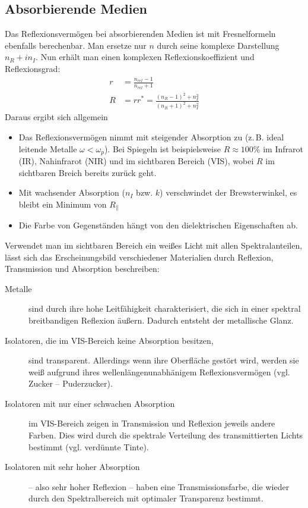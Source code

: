 
\subsection{Absorbierende Medien}
Das Reflexionsvermögen bei absorbierenden Medien ist mit
Fresnelformeln ebenfalls berechenbar. 
Man ersetze nur $n$ durch seine komplexe Darstellung $n_R+in_I$. Nun
erhält man einen komplexen Reflexionskoeffizient und
Reflexionsgrad:
\begin{align*}
  r &= \frac{n_{rel}-1}{n_{rel}+1}\\
  R &= rr^*=\frac{(n_R-1)^2+n_I^2}{(n_R+1)^2+n_I^2}
\end{align*}
Daraus ergibt sich allgemein
\begin{itemize}
\item Das Reflexionsvermögen nimmt mit steigender Absorption
  zu (z.\,B. ideal leitende Metalle $\omega<\omega_p$). Bei Spiegeln
  ist beispielsweise $R\approx100\%$ im Infrarot (IR), Nahinfrarot
  (NIR) und im sichtbaren Bereich (VIS), wobei $R$ im sichtbaren
  Breich bereits zurück geht.
\item Mit wachsender Absorption ($n_I$ bzw. $k$) verschwindet der Brewsterwinkel, es bleibt ein Minimum von $R_{\parallel}$
\item Die Farbe von Gegenständen hängt von den dielektrischen Eigenschaften ab.
\end{itemize}

Verwendet man im sichtbaren Bereich ein weißes Licht mit allen
Spektralanteilen, lässt sich das Erscheinungsbild verschiedener
Materialien durch Reflexion, Transmission und Absorption beschreiben:
\begin{description}
\item[Metalle] sind durch ihre hohe Leitfähigkeit
  charakterisiert, die sich in einer spektral breitbandigen Reflexion
  äußern. Dadurch entsteht der metallische Glanz.
\item[Isolatoren, die im VIS-Bereich keine Absorption besitzen,]
  sind transparent. Allerdings wenn ihre Oberfläche gestört wird,
  werden sie weiß aufgrund ihres wellenlängenunabhänigem
  Reflexionsvermögen (vgl. Zucker -- Puderzucker). 
\item[Isolatoren mit nur einer schwachen Absorption] im VIS-Bereich
  zeigen in Transmission und Reflexion jeweils andere Farben. Dies
  wird durch die spektrale Verteilung des transmittierten Lichts
  bestimmt (vgl. verdünnte Tinte). 
\item[Isolatoren mit sehr hoher Absorption] -- also sehr hoher
  Reflexion -- haben eine Transmissionsfarbe, die wieder durch den
  Spektralbereich mit optimaler Transparenz bestimmt.
\end{description}

